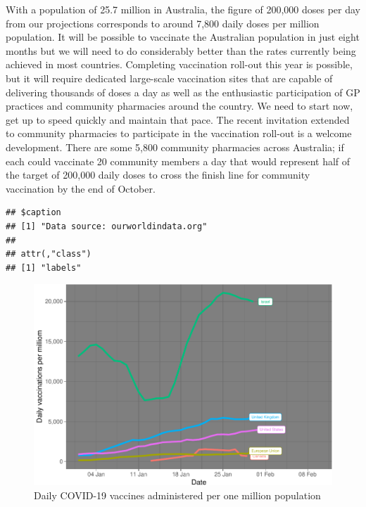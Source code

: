 \documentclass{article}
\begin{document}
With a population of 25.7 million in Australia, the figure of 200,000
doses per day from our projections corresponds to around 7,800 daily
doses per million population. It will be possible to vaccinate the
Australian population in just eight months but we will need to do
considerably better than the rates currently being achieved in most
countries. Completing vaccination roll-out this year is possible, but it
will require dedicated large-scale vaccination sites that are capable of
delivering thousands of doses a day as well as the enthusiastic
participation of GP practices and community pharmacies around the
country. We need to start now, get up to speed quickly and maintain that
pace. The recent invitation extended to community pharmacies to
participate in the vaccination roll-out is a welcome development. There
are some 5,800 community pharmacies across Australia; if each could
vaccinate 20 community members a day that would represent half of the
target of 200,000 daily doses to cross the finish line for community
vaccination by the end of October.

\begin{verbatim}
## $caption
## [1] "Data source: ourworldindata.org"
## 
## attr(,"class")
## [1] "labels"
\end{verbatim}

\begin{figure}

{\centering \includegraphics{researchNote_files/figure-latex/dailyVac-1} 

}

\caption{Daily COVID-19 vaccines administered per one million population}\label{fig:dailyVac}
\end{figure}
\end{document}
